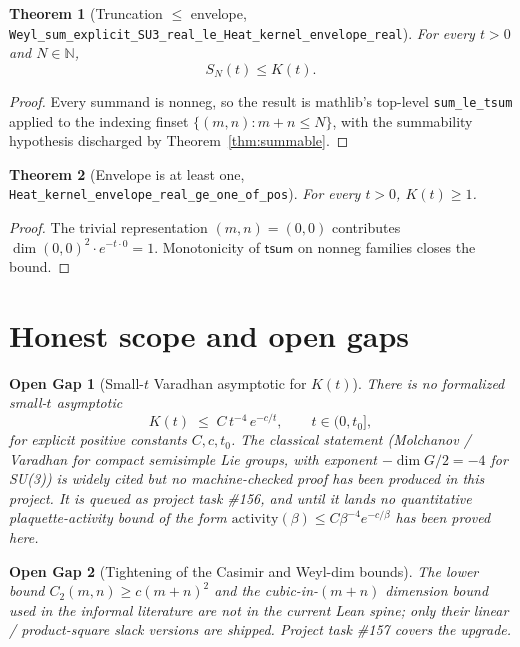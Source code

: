 \documentclass{article}
\newtheorem{theorem}{Theorem}[section]
\newtheorem*{opengap}{Open Gap}
\begin{document}
\begin{theorem}[Truncation $\le$ envelope,
\texttt{Weyl\_sum\_explicit\_SU3\_real\_le\_Heat\_kernel\_envelope\_real}]
\label{thm:bridge}
For every $t>0$ and $N \in \mathbb{N}$,
\[
  S_N(t) \le K(t).
\]
\end{theorem}

\begin{proof}
Every summand is nonneg, so the result is mathlib's top-level
\texttt{sum\_le\_tsum} applied to the indexing finset
$\{(m,n) : m+n \le N\}$, with the summability hypothesis discharged
by Theorem~\ref{thm:summable}.
\end{proof}

\begin{theorem}[Envelope is at least one,
\texttt{Heat\_kernel\_envelope\_real\_ge\_one\_of\_pos}]
\label{thm:geone}
For every $t > 0$, $K(t) \ge 1$.
\end{theorem}

\begin{proof}
The trivial representation $(m,n) = (0,0)$ contributes
$\dim(0,0)^2 \cdot e^{-t \cdot 0} = 1$. Monotonicity of $\mathsf{tsum}$
on nonneg families closes the bound.
\end{proof}

\section{Honest scope and open gaps}
\label{sec:gaps}

\begin{opengap}[Small-$t$ Varadhan asymptotic for $K(t)$]
There is no formalized small-$t$ asymptotic
\[
  K(t) \;\le\; C\, t^{-4}\, e^{-c/t}, \qquad t \in (0, t_0],
\]
for explicit positive constants $C,c,t_0$. The classical statement
(Molchanov / Varadhan for compact semisimple Lie groups, with
exponent $-\dim G / 2 = -4$ for SU(3)) is widely cited but no
machine-checked proof has been produced in this project. It is
queued as project task \#156, and until it lands no
quantitative plaquette-activity bound of the form
$\mathrm{activity}(\beta) \le C\beta^{-4} e^{-c/\beta}$ has been
proved here.
\end{opengap}

\begin{opengap}[Tightening of the Casimir and Weyl-dim bounds]
The lower bound $C_2(m,n) \ge c(m+n)^2$ and the cubic-in-$(m+n)$
dimension bound used in the informal literature are not in the
current Lean spine; only their linear / product-square slack
versions are shipped. Project task \#157 covers the upgrade.
\end{opengap}
\end{document}
